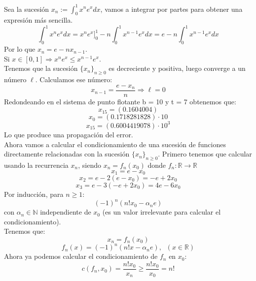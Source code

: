\begin{ejemplo}
Sea la sucesión $x_n := \int_0^1 x^ne^x dx$, vamos a integrar por partes para obtener una expresión más sencilla.
\[ \int_0^1 x^ne^x dx = x^ne^x ]_0^1 - n \int_0^1 x^{n-1}e^x dx = e - n \int_0^1 x^{n-1}e^x dx \]
Por lo que $x_n = e - nx_{n-1}$.\\
Si $x \in [0,1] \Rightarrow x^ne^x \leq x^{n-1}e^x$.\\
Tenemos que la sucesión $\lbrace x_n \rbrace _{n \geq 0}$ es decreciente y positiva, luego converge a un número $\ell$. Calculamos ese número:
\[ x_{n-1} = \frac{e - x_n}{n} \Rightarrow \ell = 0 \]
Redondeando en el sistema de punto flotante b = 10 y t = 7 obtenemos que:
\[ x_{15} = (0.1604004) \]
\[ x_0 = (0.1718281828) \cdot 10 \]
\[ x_{15} = (0.6004419078) \cdot 10^3 \]
Lo que produce una propagación del error.\\
Ahora vamos a calcular el condicionamiento de una sucesión de funciones directamente relacionadas con la sucesión $\lbrace x_n \rbrace _{n \geq 0}$. Primero tenemos que calcular usando la recurrencia $x_n$, siendo $x_n = f_n (x_0)$ donde $f_n : \mathbb{R} \rightarrow \mathbb{R}$
\[ x_1 = e - x_0 \]
\[ x_2 = e - 2(e - x_0) = -e + 2x_0 \]
\[ x_3 = e - 3(-e + 2x_0) = 4e - 6x_0 \]
Por inducción, para $n \geq 1$:
\[ (-1)^n(n!x_0 - \alpha _n e) \]
con $\alpha _n \in \mathbb{N}$ independiente de $x_0$ (es un valor irrelevante para calcular el condicionamiento).\\
Tenemos que:
\[ x_n = f_n (x_0) \]
\[ f_n (x) = (-1)^n(n!x - \alpha _ne), \; \; (x \in \mathbb{R}) \]
Ahora ya podemos calcular el condicionamiento de $f_n$ en $x_0$:
\[ c(f_n,x_0) = \frac{n!x_0}{x_n} \geq \frac{n!x_0}{x_0} = n! \]
\end{ejemplo}

